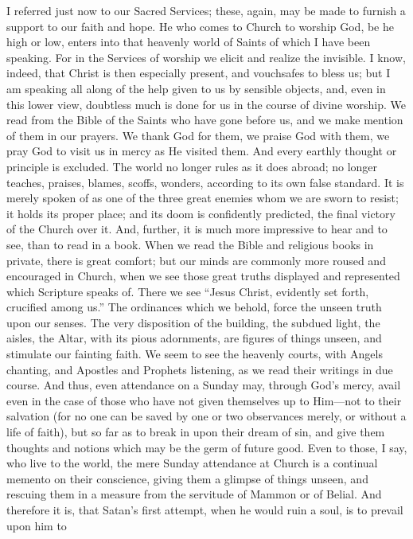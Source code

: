 I referred just now to our Sacred Services; these, again, may be
made to furnish a support to our faith and hope. He who comes to
Church to worship God, be he high or low, enters into that heavenly
world of Saints of which I have been speaking. For in the Services of
worship we elicit and realize the invisible. I know, indeed, that
Christ is then especially present, and vouchsafes to bless us; but I
am speaking all along of the help given to us by sensible objects,
and, even in this lower view, doubtless much is done for us in the
course of divine worship. We read from the Bible of the Saints who
have gone before us, and we make mention of them in our prayers. We
thank God for them, we praise God with them, we pray God to visit us
in mercy as He visited them. And every earthly thought or principle is
excluded. The world no longer rules as it does abroad; no longer
teaches, praises, blames, scoffs, wonders, according to its own false
standard. It is merely spoken of as one of the three great enemies
whom we are sworn to resist; it holds its proper place; and its doom
is confidently predicted, the final victory of the Church over it.
And, further, it is much more impressive to hear and to see, than to
read in a book. When we read the Bible and religious books in private,
there is great comfort; but our minds are commonly more roused and
encouraged in Church, when we see those great truths displayed and
represented which Scripture speaks of. There we see ``Jesus
Christ, evidently set forth, crucified among us.'' The ordinances
which we behold, force the unseen truth upon our senses. The very
disposition of the building, the subdued light, the aisles, the Altar,
with its pious adornments, are figures of things unseen, and stimulate
our fainting faith. We seem to see the heavenly courts, with Angels
chanting, and Apostles and Prophets listening, as we read their
writings in due course. And thus, even attendance on a Sunday may,
through God's mercy, avail even in the case of those who have not
given themselves up to Him—not to their salvation (for no one can be
saved by one or two observances merely, or without a life of faith),
but so far as to break in upon their dream of sin, and give them
thoughts and notions which may be the germ of future good. Even to
those, I say, who live to the world, the mere Sunday attendance at
Church is a continual memento on their conscience, giving them a
glimpse of things unseen, and rescuing them in a measure from the
servitude of Mammon or of Belial. And therefore it is, that Satan's
first attempt, when he would ruin a soul, is to prevail upon him to
